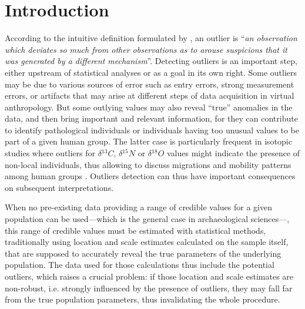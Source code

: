 \documentclass[review, 3p]{elsarticle}
\begin{document}
\section{Introduction}
\label{sec:orgeed441b}
According to the intuitive definition formulated by \citet[p.1]{hawkins1980_IdentificationOutliers}, an outlier is ``\emph{an observation which deviates so much from other observations as to arouse suspicions that it was generated by a different mechanism}''. Detecting outliers is an important step, either upstream of statistical analyses or as a goal in its own right. Some outliers may be due to various sources of error such as entry errors, strong measurement errors, or artifacts that may arise at different steps of data acquisition in virtual anthropology. But some outlying values may also reveal ``true'' anomalies in the data, and then bring important and relevant information, for they can contribute to identify pathological individuals \citep{dietmeier2018_OxenOxonHill} or individuals having too unusual values to be part of a given human group. The latter case is particularly frequent in isotopic studies where outliers for \(\delta{}^{13}C\), \(\delta{}^{15}N\) or \(\delta{}^{18}O\) values might indicate the presence of non-local individuals, thus allowing to discuss migrations and mobility patterns among human groups \citep{santana-sagredo2015_IsotopicEvidenceDivergent,hakenbeck2010_DietMobilityEarly,knudson2011_InvestigatingRegionalMobility,kendall2013_MobilityMortalityMiddle}. Outliers detection can thus have important consequences on subsequent interpretations.

When no pre-existing data providing a range of credible values for a given population can be used---which is the general case in archaeological sciences---, this range of credible values must be estimated with statistical methods, traditionally using location and scale estimates calculated on the sample itself, that are supposed to accurately reveal the true parameters of the underlying population. The data used for those calculations thus include the potential outliers, which raises a crucial problem: if those location and scale estimates are non-robust, i.e. strongly influenced by the presence of outliers, they may fall far from the true population parameters, thus invalidating the whole procedure.
\end{document}
